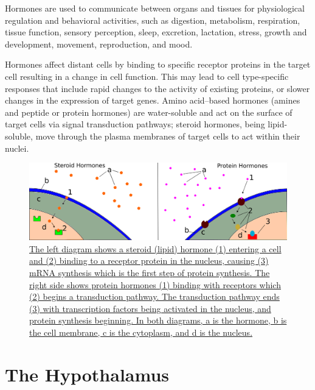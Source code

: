 Hormones are used to communicate between organs and tissues for physiological regulation and behavioral activities, such as digestion, metabolism, respiration, tissue function, sensory perception, sleep, excretion, lactation, stress, growth and development, movement, reproduction, and mood.

Hormones affect distant cells by binding to specific receptor proteins in the target cell resulting in a change in cell function. This may lead to cell type-specific responses that include rapid changes to the activity of existing proteins, or slower changes in the expression of target genes. Amino acid--based hormones (amines and peptide or protein hormones) are water-soluble and act on the surface of target cells via signal transduction pathways; steroid hormones, being lipid-soluble, move through the plasma membranes of target cells to act within their nuclei.



\begin{figure}

{\centering \includegraphics[width=0.7\linewidth]{./figures/endocrine/Steroid and Lipid Hormones} 

}

\caption{\href{https://commons.wikimedia.org/wiki/File:Steroid_and_Lipid_Hormones.svg}{The left diagram shows a steroid (lipid) hormone (1) entering a cell and (2) binding to a receptor protein in the nucleus, causing (3) mRNA synthesis which is the first step of protein synthesis. The right side shows protein hormones (1) binding with receptors which (2) begins a transduction pathway. The transduction pathway ends (3) with transcription factors being activated in the nucleus, and protein synthesis beginning. In both diagrams, a is the hormone, b is the cell membrane, c is the cytoplasm, and d is the nucleus.}}\label{fig:hormoneaction}
\end{figure}

\hypertarget{the-hypothalamus}{%
\section{The Hypothalamus}\label{the-hypothalamus}}

